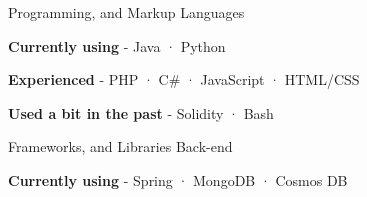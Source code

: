 

\begin{cventries}
  
  \cventry
    {Programming, and Markup} %
    {Languages} %
    {} %
    {} %
    {
      \begin{cvitems} %
        \item {\textbf{Currently using} \hspace{0.03cm} - \hspace{0.03cm} Java \hspace{0.03cm} · \hspace{0.03cm} Python} %
        \item {\textbf{Experienced} \hspace{0.03cm} - \hspace{0.03cm} PHP \hspace{0.03cm} · \hspace{0.03cm} C\# \hspace{0.03cm} · \hspace{0.03cm} JavaScript \hspace{0.03cm} · \hspace{0.03cm} HTML/CSS \hspace{0.03cm}} %
        \item {\textbf{Used a bit in the past} \hspace{0.03cm} - \hspace{0.03cm} Solidity \hspace{0.03cm} · \hspace{0.03cm} Bash \\} %
      \end{cvitems}
    }
\cventry
{Frameworks, and Libraries} %
{Back-end} %
{} %
{} %
{
  \begin{cvitems} %
    \item {\textbf{Currently using} \hspace{0.03cm} - \hspace{0.03cm} Spring \hspace{0.03cm} · \hspace{0.03cm} MongoDB \hspace{0.03cm} · \hspace{0.03cm} Cosmos DB} %

\end{cvitems}}
\end{cventries}
